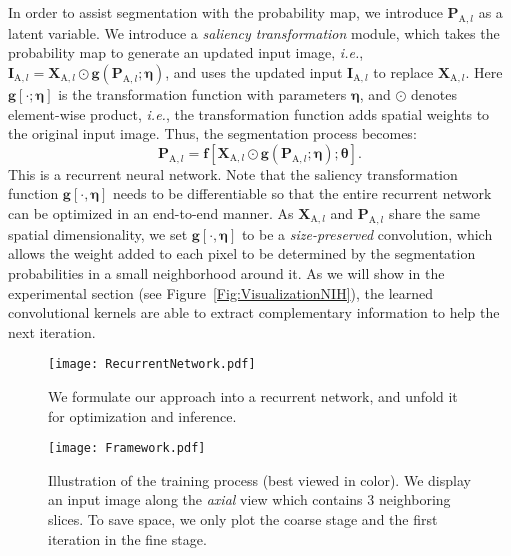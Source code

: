 \documentclass[10pt,twocolumn,letterpaper]{article}
\begin{document}
In order to assist segmentation with the probability map, we introduce $\mathbf{P}_{\mathrm{A},l}$ as a latent variable.
We introduce a {\em saliency transformation} module, which takes the probability map to generate an updated input image,
{\em i.e.}, ${\mathbf{I}_{\mathrm{A},l}}={\mathbf{X}_{\mathrm{A},l}\odot
    \mathbf{g}\!\left(\mathbf{P}_{\mathrm{A},l};\boldsymbol{\eta}\right)}$,
and uses the updated input $\mathbf{I}_{\mathrm{A},l}$ to replace $\mathbf{X}_{\mathrm{A},l}$.
Here $\mathbf{g}\!\left[\cdot;\boldsymbol{\eta}\right]$ is the transformation function with parameters $\boldsymbol{\eta}$,
and $\odot$ denotes element-wise product,
{\em i.e.}, the transformation function adds spatial weights to the original input image.
Thus, the segmentation process becomes:
\begin{equation}
\label{Eqn:RecurrentNetwork}
{\mathbf{P}_{\mathrm{A},l}}=
    {\mathbf{f}\!\left[\mathbf{X}_{\mathrm{A},l}\odot
    \mathbf{g}\!\left(\mathbf{P}_{\mathrm{A},l};\boldsymbol{\eta}\right);\boldsymbol{\theta}\right]}.
\end{equation}
This is a recurrent neural network.
Note that the saliency transformation function $\mathbf{g}\!\left[\cdot,\boldsymbol{\eta}\right]$
needs to be differentiable so that the entire recurrent network can be optimized in an end-to-end manner.
As $\mathbf{X}_{\mathrm{A},l}$ and $\mathbf{P}_{\mathrm{A},l}$ share the same spatial dimensionality,
we set $\mathbf{g}\!\left[\cdot,\boldsymbol{\eta}\right]$ to be a {\em size-preserved} convolution,
which allows the weight added to each pixel to be determined by the segmentation probabilities in a small neighborhood around it.
As we will show in the experimental section (see Figure~\ref{Fig:VisualizationNIH}),
the learned convolutional kernels are able to extract complementary information to help the next iteration.

\renewcommand{\figurewidth}{8.0cm}
\begin{figure}[t]
\begin{center}
    \texttt{[image: RecurrentNetwork.pdf]}
\end{center}
\caption{
    We formulate our approach into a recurrent network, and unfold it for optimization and inference.
}
\label{Fig:RecurrentNetwork}
\end{figure}

\renewcommand{\figurewidth}{15.0cm}
\begin{figure*}[t]
\begin{center}
    \texttt{[image: Framework.pdf]}
\end{center}
\caption{
    Illustration of the training process (best viewed in color).
    We display an input image along the {\em axial} view which contains $3$ neighboring slices.
    To save space, we only plot the coarse stage and the first iteration in the fine stage.
}
\label{Fig:Framework}
\end{figure*}
\end{document}
